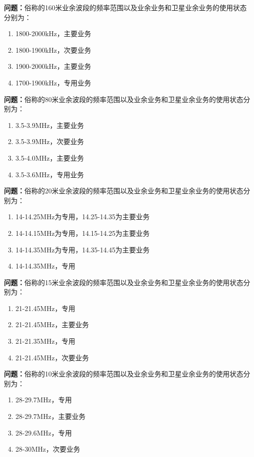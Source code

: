 \noindent\textbf{问题：}俗称的160米业余波段的频率范围以及业余业务和卫星业余业务的使用状态分别为：
\begin{enumerate}[label=\Alph*), leftmargin=3em]
\item 1800-2000kHz，主要业务
\item 1800-1900kHz，次要业务
\item 1900-2000kHz，主要业务
\item 1700-1900kHz，专用业务
\end{enumerate}

\bigskip


\noindent\textbf{问题：}俗称的80米业余波段的频率范围以及业余业务和卫星业余业务的使用状态分别为：
\begin{enumerate}[label=\Alph*), leftmargin=3em]
\item 3.5-3.9MHz，主要业务
\item 3.5-3.9MHz，次要业务
\item 3.5-4.0MHz，主要业务
\item 3.5-3.6MHz，专用业务
\end{enumerate}

\bigskip


\noindent\textbf{问题：}俗称的20米业余波段的频率范围以及业余业务和卫星业余业务的使用状态分别为：
\begin{enumerate}[label=\Alph*), leftmargin=3em]
\item 14-14.25MHz为专用，14.25-14.35为主要业务
\item 14-14.15MHz为专用，14.15-14.25为主要业务
\item 14-14.35MHz为专用，14.35-14.45为主要业务
\item 14-14.35MHz，专用
\end{enumerate}

\bigskip


\noindent\textbf{问题：}俗称的15米业余波段的频率范围以及业余业务和卫星业余业务的使用状态分别为：
\begin{enumerate}[label=\Alph*), leftmargin=3em]
\item 21-21.45MHz，专用
\item 21-21.45MHz，主要业务
\item 21-21.35MHz，专用
\item 21-21.45MHz，次要业务
\end{enumerate}

\bigskip


\noindent\textbf{问题：}俗称的10米业余波段的频率范围以及业余业务和卫星业余业务的使用状态分别为：
\begin{enumerate}[label=\Alph*), leftmargin=3em]
\item 28-29.7MHz，专用
\item 28-29.7MHz，主要业务
\item 28-29.6MHz，专用
\item 28-30MHz，次要业务
\end{enumerate}

